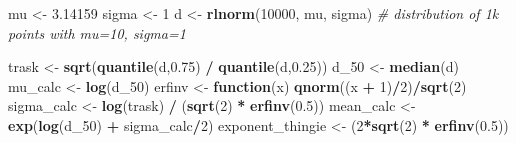 \documentclass[]{article}
\newenvironment{Shaded}{\begin{snugshade}}{\end{snugshade}}
\newcommand{\KeywordTok}[1]{\textcolor[rgb]{0.13,0.29,0.53}{\textbf{#1}}}
\newcommand{\DecValTok}[1]{\textcolor[rgb]{0.00,0.00,0.81}{#1}}
\newcommand{\FloatTok}[1]{\textcolor[rgb]{0.00,0.00,0.81}{#1}}
\newcommand{\StringTok}[1]{\textcolor[rgb]{0.31,0.60,0.02}{#1}}
\newcommand{\CommentTok}[1]{\textcolor[rgb]{0.56,0.35,0.01}{\textit{#1}}}
\newcommand{\ControlFlowTok}[1]{\textcolor[rgb]{0.13,0.29,0.53}{\textbf{#1}}}
\newcommand{\OperatorTok}[1]{\textcolor[rgb]{0.81,0.36,0.00}{\textbf{#1}}}
\newcommand{\NormalTok}[1]{#1}
\begin{document}
\begin{Shaded}
\begin{Highlighting}[]
\NormalTok{mu <-}\StringTok{ }\FloatTok{3.14159}
\NormalTok{sigma <-}\StringTok{ }\DecValTok{1}
\NormalTok{d <-}\StringTok{ }\KeywordTok{rlnorm}\NormalTok{(}\DecValTok{10000}\NormalTok{, mu, sigma) }\CommentTok{# distribution of 1k points with mu=10, sigma=1}

\NormalTok{trask <-}\StringTok{ }\KeywordTok{sqrt}\NormalTok{(}\KeywordTok{quantile}\NormalTok{(d,}\FloatTok{0.75}\NormalTok{) }\OperatorTok{/}\StringTok{ }\KeywordTok{quantile}\NormalTok{(d,}\FloatTok{0.25}\NormalTok{))}
\NormalTok{d_}\DecValTok{50}\NormalTok{ <-}\StringTok{ }\KeywordTok{median}\NormalTok{(d)}
\NormalTok{mu_calc <-}\StringTok{ }\KeywordTok{log}\NormalTok{(d_}\DecValTok{50}\NormalTok{)}
\NormalTok{erfinv <-}\StringTok{ }\ControlFlowTok{function}\NormalTok{(x) }\KeywordTok{qnorm}\NormalTok{((x }\OperatorTok{+}\StringTok{ }\DecValTok{1}\NormalTok{)}\OperatorTok{/}\DecValTok{2}\NormalTok{)}\OperatorTok{/}\KeywordTok{sqrt}\NormalTok{(}\DecValTok{2}\NormalTok{)}
\NormalTok{sigma_calc <-}\StringTok{ }\KeywordTok{log}\NormalTok{(trask) }\OperatorTok{/}\StringTok{ }\NormalTok{(}\KeywordTok{sqrt}\NormalTok{(}\DecValTok{2}\NormalTok{) }\OperatorTok{*}\StringTok{ }\KeywordTok{erfinv}\NormalTok{(}\FloatTok{0.5}\NormalTok{))}
\NormalTok{mean_calc <-}\StringTok{ }\KeywordTok{exp}\NormalTok{(}\KeywordTok{log}\NormalTok{(d_}\DecValTok{50}\NormalTok{) }\OperatorTok{+}\StringTok{ }\NormalTok{sigma_calc}\OperatorTok{/}\DecValTok{2}\NormalTok{)}
\NormalTok{exponent_thingie <-}\StringTok{ }\NormalTok{(}\DecValTok{2}\OperatorTok{*}\KeywordTok{sqrt}\NormalTok{(}\DecValTok{2}\NormalTok{) }\OperatorTok{*}\StringTok{ }\KeywordTok{erfinv}\NormalTok{(}\FloatTok{0.5}\NormalTok{))}


\end{Highlighting}
\end{Shaded}
\end{document}
